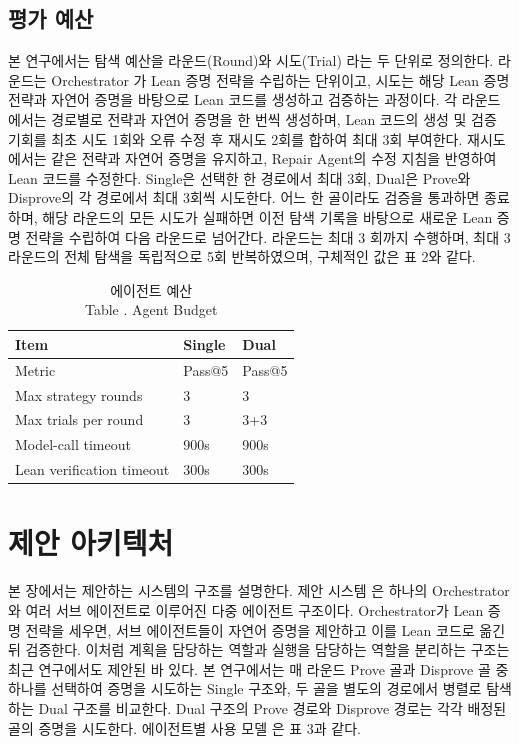 \documentclass[a4paper,9pt,twocolumn]{extarticle}
\begin{document}
\subsection{평가 예산}


본 연구에서는 탐색 예산을 라운드(Round)와 시도(Trial) 라는 두 단위로 정의한다. 라운드는 Orchestrator 가 Lean 증명 전략을 수립하는 단위이고, 시도는 해당 Lean 증명 전략과 자연어 증명을 바탕으로 Lean 코드를 생성하고 검증하는 과정이다. 각 라운드 에서는 경로별로 전략과 자연어 증명을 한 번씩 생성하며, Lean 코드의 생성 및 검증 기회를 최초 시도 1회와 오류 수정 후 재시도 2회를 합하여 최대 3회 부여한다. 재시도 에서는 같은 전략과 자연어 증명을 유지하고, Repair Agent의 수정 지침을 반영하여 Lean 코드를 수정한다. Single은 선택한 한 경로에서 최대 3회, Dual은 Prove와 Disprove의 각 경로에서 최대 3회씩 시도한다. 어느 한 골이라도 검증을 통과하면 종료하며, 해당 라운드의 모든 시도가 실패하면 이전 탐색 기록을 바탕으로 새로운 Lean 증명 전략을 수립하여 다음 라운드로 넘어간다. 라운드는 최대 3 회까지 수행하며, 최대 3라운드의 전체 탐색을 독립적으로 5회 반복하였으며, 구체적인 값은 표 2와 같다.

\begin{table}[htbp]\centering\footnotesize
\caption{에이전트 예산\\Table \thetable. Agent Budget}\label{tab:1}
\setlength{\tabcolsep}{3pt}\renewcommand{\arraystretch}{1.2}
\begin{tabularx}{\columnwidth}{>{\raggedright\arraybackslash}p{}XX}
\toprule
Item & Single & Dual \\
\midrule
Metric & \textnormal{Pass@5} & \textnormal{Pass@5} \\
Max strategy rounds & 3 & 3 \\
\textnormal{Max trials per round} & \textnormal{3} & \textnormal{3+3} \\
Model-call timeout & 900s & 900s \\
Lean verification timeout & 300s & 300s \\
\bottomrule\end{tabularx}\end{table}

\section{제안 아키텍처}


본 장에서는 제안하는 시스템의 구조를 설명한다. 제안 시스템 은 하나의 Orchestrator 와 여러 서브 에이전트로 이루어진 다중 에이전트 구조이다. Orchestrator가 Lean 증명 전략을 세우면, 서브 에이전트들이 자연어 증명을 제안하고 이를 Lean 코드로 옮긴 뒤 검증한다. 이처럼 계획을 담당하는 역할과 실행을 담당하는 역할을 분리하는 구조는 최근 연구에서도 제안된 바 있다\cite{r14,r15}. 본 연구에서는 매 라운드 Prove 골과 Disprove 골 중 하나를 선택하여 증명을 시도하는 Single 구조와, 두 골을 별도의 경로에서 병렬로 탐색하는 Dual 구조를 비교한다. Dual 구조의 Prove 경로와 Disprove 경로는 각각 배정된 골의 증명을 시도한다. 에이전트별 사용 모델 은 표 3과 같다.
\end{document}
